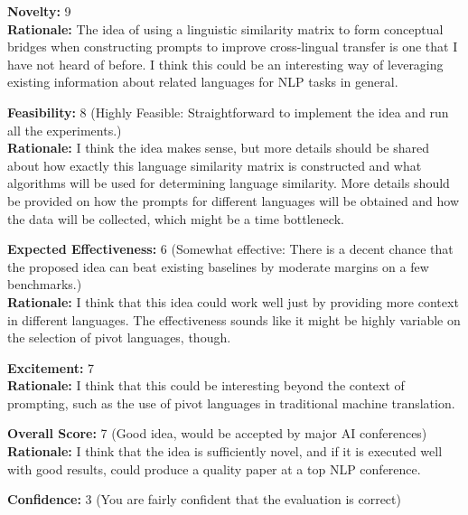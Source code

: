 \begin{tcolorbox}[colback=green!10!white, colframe=green!80!black, title=\textbf{Reviewer 1}]
\small
\textbf{Novelty:} 9\\
\textbf{Rationale:} The idea of using a linguistic similarity matrix to form conceptual bridges when constructing prompts to improve cross-lingual transfer is one that I have not heard of before. I think this could be an interesting way of leveraging existing information about related languages for NLP tasks in general.

\vspace{10pt}

\textbf{Feasibility:} 8 (Highly Feasible: Straightforward to implement the idea and run all the experiments.)\\
\textbf{Rationale:} I think the idea makes sense, but more details should be shared about how exactly this language similarity matrix is constructed and what algorithms will be used for determining language similarity. More details should be provided on how the prompts for different languages will be obtained and how the data will be collected, which might be a time bottleneck.

\vspace{10pt}

\textbf{Expected Effectiveness:} 6 (Somewhat effective: There is a decent chance that the proposed idea can beat existing baselines by moderate margins on a few benchmarks.)\\
\textbf{Rationale:} I think that this idea could work well just by providing more context in different languages. The effectiveness sounds like it might be highly variable on the selection of pivot languages, though.

\vspace{10pt}

\textbf{Excitement:} 7\\
\textbf{Rationale:} I think that this could be interesting beyond the context of prompting, such as the use of pivot languages in traditional machine translation.

\vspace{10pt}

\textbf{Overall Score:} 7 (Good idea, would be accepted by major AI conferences)\\
\textbf{Rationale:} I think that the idea is sufficiently novel, and if it is executed well with good results, could produce a quality paper at a top NLP conference.

\vspace{10pt}

\textbf{Confidence:} 3 (You are fairly confident that the evaluation is correct)
\end{tcolorbox}

